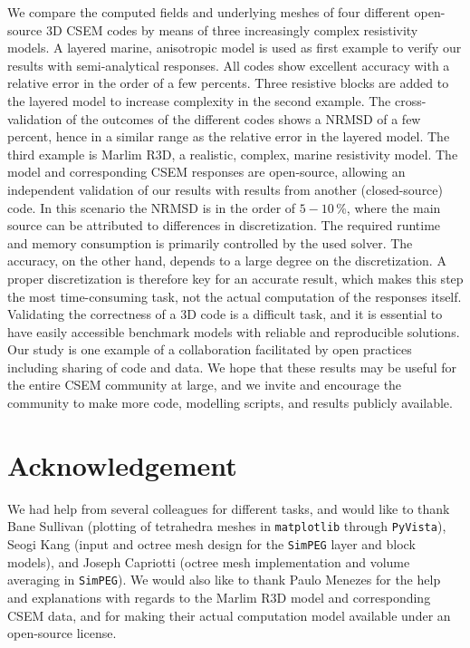 \documentclass[
    paper,
  ]{geophysics}
\newcommand{\simpeg}{\texttt{SimPEG}\xspace}
\begin{document}
We compare the computed fields and underlying meshes of four different open-source 3D CSEM codes by means of three increasingly complex resistivity models. A layered marine, anisotropic model is used as first example to verify our results with semi-analytical responses. All codes show excellent accuracy with a relative error in the order of a few percents. Three resistive blocks are added to the layered model to increase complexity in the second example. The cross-validation of the outcomes of the different codes shows a NRMSD of a few percent, hence in a similar range as the relative error in the layered model. The third example is Marlim R3D, a realistic, complex, marine resistivity model. The model and corresponding CSEM responses are open-source, allowing an independent validation of our results with results from another (closed-source) code. In this scenario the NRMSD is in the order of $5-10$\,\%, where the main source can be attributed to differences in discretization. The required runtime and memory consumption is primarily controlled by the used solver. The accuracy, on the other hand, depends to a large degree on the discretization. A proper discretization is therefore key for an accurate result, which makes this step the most time-consuming task, not the actual computation of the responses itself. Validating the correctness of a 3D code is a difficult task, and it is essential to have easily accessible benchmark models with reliable and reproducible solutions. Our study is one example of a collaboration facilitated by open practices including sharing of code and data. We hope that these results may be useful for the entire CSEM community at large, and we invite and encourage the community to make more code, modelling scripts, and results publicly available.


\section{Acknowledgement}

We had help from several colleagues for different tasks, and would like to thank Bane Sullivan (plotting of tetrahedra meshes in \texttt{matplotlib} through \texttt{PyVista}), Seogi Kang (input and octree mesh design for the \simpeg layer and block models), and Joseph Capriotti (octree mesh implementation and volume averaging in \simpeg). We would also like to thank Paulo Menezes for the help and explanations with regards to the Marlim R3D model and corresponding CSEM data, and for making their actual computation model available under an open-source license.
\end{document}
